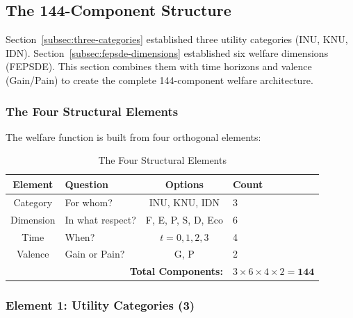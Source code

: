 \subsection{The 144-Component Structure}
\label{subsec:144-structure}


Section~\ref{subsec:three-categories} established three utility categories (INU, KNU, IDN).
Section~\ref{subsec:fepsde-dimensions} established six welfare dimensions (FEPSDE).
This section combines them with time horizons and valence (Gain/Pain) to create
the complete 144-component welfare architecture.

\subsubsection{The Four Structural Elements}

The welfare function is built from four orthogonal elements:

\begin{table}[htbp]
\centering
\caption{The Four Structural Elements}
\label{tab:four-elements}
\renewcommand{\arraystretch}{1.4}
\begin{tabular}{@{}clcl@{}}
\toprule
\textbf{Element} & \textbf{Question} & \textbf{Options} & \textbf{Count} \\
\midrule
Category & For whom? & INU, KNU, IDN & 3 \\
Dimension & In what respect? & F, E, P, S, D, Eco & 6 \\
Time & When? & $t = 0, 1, 2, 3$ & 4 \\
Valence & Gain or Pain? & G, P & 2 \\
\midrule
\multicolumn{3}{r}{\textbf{Total Components:}} & $3 \times 6 \times 4 \times 2 = \mathbf{144}$ \\
\bottomrule
\end{tabular}
\end{table}

\subsubsection{Element 1: Utility Categories (3)}

